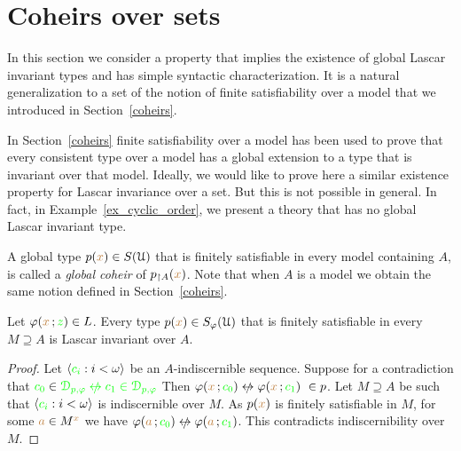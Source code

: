 \section{Coheirs over sets}\label{coheirs_sets}

In this section we consider a property that implies the existence of global Lascar invariant types and has simple syntactic characterization.
It is a natural generalization to a set of the notion of finite satisfiability over a model that we introduced in Section~\ref{coheirs}.

In Section~\ref{coheirs} finite satisfiability over a model has been used to prove that every consistent type over a model has a global extension to a type that is invariant over that model. 
Ideally, we would like to prove here a similar existence property for Lascar invariance over a set.
But this is not possible in general.
In fact, in Example~\ref{ex_cyclic_order}, we present a theory that has no global Lascar invariant type.


A global type $p({\color{brown} x})\in S(\EuScript U)$ that is finitely satisfiable in every model containing $A$, is called a \emph{global coheir\/} of $p_{\restriction A}({\color{brown} x})$. 
Note that when $A$ is a model we obtain the same notion defined in Section~\ref{coheirs}.

\begin{proposition} 
  Let $\varphi({\color{brown} x}\,;{\color{green} z})\in L$.
  Every type $p({\color{brown} x})\in S_\varphi(\EuScript U)$ that is finitely satisfiable in every $M\supseteq A$ is Lascar invariant over $A$.
\end{proposition}

\begin{proof}
  Let $\langle{\color{green}c_i}:i<\omega\rangle$ be an $A\mbox{-}$indiscernible sequence.
  Suppose for a contradiction that ${\gr c_0}\in\gr\D_{p,\phi}\niff{\gr c_1}\in\gr\D_{p,\phi}$
  Then $\phi({\mr x}\,;{\gr c_0})\niff\phi({\mr x}\,;{\gr c_1})\ \in p$.
  Let $M\supseteq A$ be such that $\langle{\color{green}c_i}:i<\omega\rangle$ is indiscernible over $M$.
  As $p({\color{brown} x})$ is finitely satisfiable in $M$, for some ${\color{brown} a}\in M^{\color{brown} x}$ we have $\phi({\mr a}\,;{\gr c_0})\niff\phi({\mr a}\,;{\gr c_1})$.
  This contradicts indiscernibility over $M$.
\end{proof}

